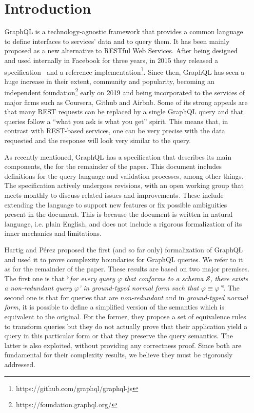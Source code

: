\section{Introduction}

GraphQL is a technology-agnostic framework that provides a common language to define interfaces to services' data and to query them. It has been mainly proposed as a new alternative to RESTful Web Services. After being designed and used internally in Facebook for three years, in 2015 they released a specification~\cite{gqlspec} and a reference implementation\footnote{https://github.com/graphql/graphql-js}. Since then, GraphQL has seen a huge increase in their extent, community and popularity, becoming an independent foundation\footnote{https://foundation.graphql.org/} early on 2019 and being incorporated to the services of major firms such as Coursera, Github and Airbnb. Some of its strong appeals are that many REST requests can be replaced by a single GraphQL query and that queries follow a ``what you ask is what you get'' spirit. This means that, in contrast with REST-based services, one can be very precise with the data requested and the response will look very similar to the query.

As recently mentioned, GraphQL has a specification that describes its main components, the \spec{} for the remainder of the paper. This document includes definitions for the query language and validation processes, among other things. The specification actively undergoes revisions, with an open working group that meets monthly to discuss related issues and improvements. These include extending the language to support new features or fix possible ambiguities present in the document. This is because the document is written in natural language, i.e. plain English, and does not include a rigorous formalization of its inner mechanics and limitations.

Hartig and Pérez proposed the first (and so far only) formalization of GraphQL~\cite{gqlph} and used it to prove complexity boundaries for GraphQL queries.
We refer to it as \HP{} for the remainder of the paper. These results are based on two major premises. The first one is that ``\textit{for every query $\varphi$ that conforms to a schema $\mathcal{S}$, there exists a {\normalfont non-redundant} query $\varphi$' in {\normalfont ground-typed normal form} such that $\varphi \equiv \varphi$'}''. The second one is that for queries that are \textit{non-redundant} and in \textit{ground-typed normal form}, it is possible to define a simplified version of the semantics which is equivalent to the original.
For the former, they propose a set of equivalence rules to transform queries but they do not actually prove that their application yield a query in this particular form or that they preserve the query semantics. The latter is also exploited, without providing any correctness proof. Since both are fundamental for their complexity results, we believe they must be rigorously addressed.

